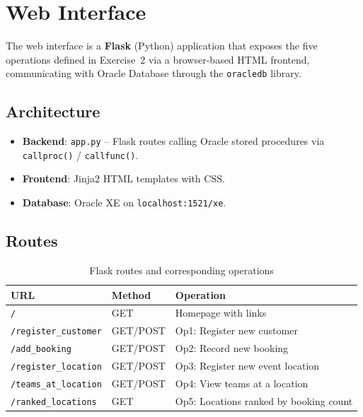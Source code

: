 \documentclass[12pt]{article}
\begin{document}
\newpage
\section{Web Interface}

The web interface is a \textbf{Flask} (Python) application that exposes the five operations defined in
Exercise~2 via a browser-based HTML frontend, communicating with Oracle Database through the
\texttt{oracledb} library.

\subsection{Architecture}

\begin{itemize}
  \item \textbf{Backend}: \texttt{app.py} -- Flask routes calling Oracle stored procedures via
        \texttt{callproc()} / \texttt{callfunc()}.
  \item \textbf{Frontend}: Jinja2 HTML templates with CSS.
  \item \textbf{Database}: Oracle XE on \texttt{localhost:1521/xe}.
\end{itemize}

\subsection{Routes}

\begin{table}[H]
  \renewcommand{\arraystretch}{1.3}
  \begin{tabularx}{\textwidth}{|l|l|X|}
  \hline
  \textbf{URL} & \textbf{Method} & \textbf{Operation} \\ \hline
  \texttt{/}                   & GET      & Homepage with links \\ \hline
  \texttt{/register\_customer} & GET/POST & Op1: Register new customer \\ \hline
  \texttt{/add\_booking}       & GET/POST & Op2: Record new booking \\ \hline
  \texttt{/register\_location} & GET/POST & Op3: Register new event location \\ \hline
  \texttt{/teams\_at\_location}& GET/POST & Op4: View teams at a location \\ \hline
  \texttt{/ranked\_locations}  & GET      & Op5: Locations ranked by booking count \\ \hline
  \end{tabularx}
  \caption{Flask routes and corresponding operations}
\end{table}
\end{document}
